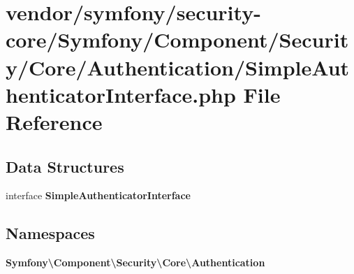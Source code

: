 \section{vendor/symfony/security-\/core/\+Symfony/\+Component/\+Security/\+Core/\+Authentication/\+Simple\+Authenticator\+Interface.php File Reference}
\label{_simple_authenticator_interface_8php}
\subsection*{Data Structures}
\begin{DoxyCompactItemize}
\item 
interface {\bf Simple\+Authenticator\+Interface}
\end{DoxyCompactItemize}
\subsection*{Namespaces}
\begin{DoxyCompactItemize}
\item 
 {\bf Symfony\textbackslash{}\+Component\textbackslash{}\+Security\textbackslash{}\+Core\textbackslash{}\+Authentication}
\end{DoxyCompactItemize}
